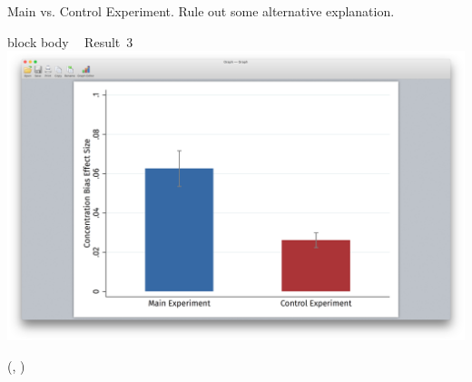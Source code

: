 \documentclass{beamer}
\newlength{\blockThree}
\begin{document}
\begin{frame}[t]
\begin{textblock*}{\colwidth}
\begin{alertblock}{
	\begin{minipage}[b]{53pt}
		\RaggedRight
		\noindent\hspace{-7pt}
	\end{minipage}
	\begin{minipage}[b]{\colwidth-145pt}
		Main vs. Control Experiment.\;
		{\mdseries Rule out some alternative explanation.}
	\end{minipage}
}
\begin{beamercolorbox}[ht=8.0in, center]{block body}
	\Large\textcolor{SpotColor}{\textbf{~} \hspace{0.5in} {\firasemibold\small Result~3}} \\[15pt]
	\includegraphics[width=9.13in, trim={3.75in 1.75in 3.75in 2in}, clip]
		{1_Example_Content/Images/average_main_control.png} \\[59pt]
\end{beamercolorbox}
\end{alertblock}

\end{textblock*}


\TPshowboxesfalse




\begin{textblock*}{\colwidth}(\leftmargin, \blockThree)


\end{textblock*}
\end{frame}
\end{document}
